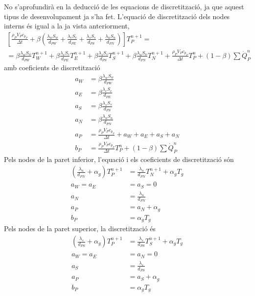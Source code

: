 No s'aprofundirà en la deducció de les equacions de discretització, ja que aquest tipus de desenvolupament ja s'ha fet. L'equació de discretització dels nodes interns és igual a la ja vista anteriorment,
\begin{multline} \label{eq:nova_equacio_discretitzacio_nodes_interns}
	\left[
	\frac{\rho_P V_P c_{p_P}}{\Delta t} + 
	\beta \left(
	\frac{\lambda_w S_w}{d_{PW}} + 
	\frac{\lambda_e S_e}{d_{PE}} + 
	\frac{\lambda_s S_s}{d_{PS}} + 
	\frac{\lambda_n S_n}{d_{PN}}
	\right)
	\right] T_P^{n+1} = \\
	=
	\beta \frac{\lambda_w S_w}{d_{PW}} T_W^{n+1} + 
	\beta \frac{\lambda_e S_e}{d_{PE}} T_E^{n+1} + 
	\beta \frac{\lambda_s S_s}{d_{PS}} T_S^{n+1} + 
	\beta \frac{\lambda_n S_n}{d_{PN}} T_N^{n+1} + 
	\frac{\rho_P V_P c_{p_P}}{\Delta t} T_P^n + 
	(1 - \beta) \sum \dot{Q}_P^n	
\end{multline}
amb coeficients de discretització
\begin{align}
	a_W &= \beta \frac{\lambda_w S_w}{d_{PW}} \\
	a_E &= \beta \frac{\lambda_e S_e}{d_{PE}} \\
	a_S &= \beta \frac{\lambda_s S_s}{d_{PS}} \\
	a_N &= \beta \frac{\lambda_n S_n}{d_{PN}} \\
	a_P &= \frac{\rho_P V_P c_{p_P}}{\Delta t} + a_W + a_E + a_S + a_N \\
	b_P &= \frac{\rho_P V_P c_{p_P}}{\Delta t} T_P^n + (1 - \beta) \sum \dot{Q}_P^n	
\end{align}
Pels nodes de la paret inferior, l'equació i els coeficients de discretització són
\begin{align}
	\left( \frac{\lambda_n}{d_{PN}} + \alpha_g \right) T_P^{n+1} &= 
	\frac{\lambda_n}{d_{PN}} T_N^{n+1} + \alpha_g T_g \\
	a_W = a_E &= a_S = 0 \\
	a_N &= \frac{\lambda_n}{d_{PN}} \\
	a_P &= a_N + \alpha_g \\
	b_P &= \alpha_g T_g
\end{align}
Pels nodes de la paret superior, la discretització és
\begin{align}
	\left( \frac{\lambda_s}{d_{PS}} + \alpha_g \right) T_P^{n+1} &= 
	\frac{\lambda_s}{d_{PS}} T_S^{n+1} + \alpha_g T_g \\
	a_W = a_E &= a_N = 0 \\
	a_S &= \frac{\lambda_s}{d_{PS}} \\
	a_P &= a_S + \alpha_g \\
	b_P &= \alpha_g T_g
\end{align}
